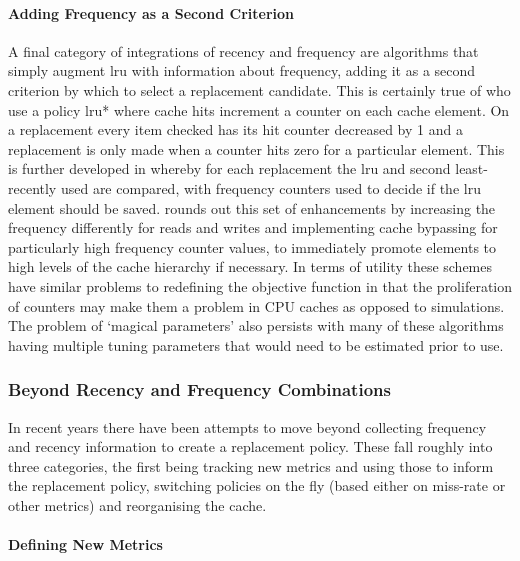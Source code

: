 \paragraph{Adding Frequency as a Second Criterion}

A final category of integrations of recency and frequency are algorithms that simply augment \gls{lru} with information about frequency, adding it as a second criterion by which to select a replacement candidate. This is certainly true of \citet{changLRUWWWProxy1999} who use a policy \gls{lru}* where cache hits increment a counter on each cache element. On a replacement every item checked has its hit counter decreased by 1 and a replacement is only made when a counter hits zero for a particular element.  This is further developed in \citet{alghazoSFLRUCacheReplacement2004} whereby for each replacement the \gls{lru} and second least-recently used are compared, with frequency counters used to decide if the \gls{lru} element should be saved. \citet{dybdahlLRUbasedReplacementAlgorithm2006} rounds out this set of enhancements by increasing the frequency differently for reads and writes and implementing cache bypassing for particularly high frequency counter values, to immediately promote elements to high levels of the cache hierarchy if necessary. In terms of utility these schemes have similar problems to redefining the objective function in that the proliferation of counters may make them a problem in CPU caches as opposed to simulations. The problem of `magical parameters' also persists with many of these algorithms having multiple tuning parameters that would need to be estimated prior to use.


\subsubsection{Beyond Recency and Frequency Combinations}

In recent years there have been attempts to move beyond collecting frequency and recency information to create a replacement policy. These fall roughly into three categories, the first being tracking new metrics and using those to inform the replacement policy, switching policies on the fly (based either on miss-rate or other metrics) and reorganising the cache. 

\paragraph{Defining New Metrics}

